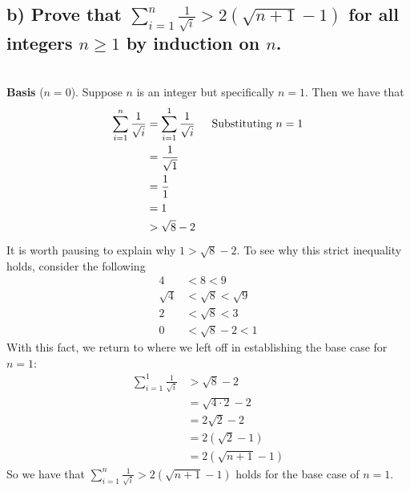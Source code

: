 \documentclass[11pt, letterpaper]{article}
\begin{document}
\subsection*{b) Prove that $\sum_{i=1}^{n}\frac{1}{\sqrt{i}}>2(\sqrt{n+1}-1)$ for all integers $n\geq 1$ by induction on $n$.}
\begin{prf}[by induction]~\\
    {\bf Basis} ($n=0$). Suppose $n$ is an integer but specifically $n=1$. Then we have that
    \begin{align*}
        \sum_{i=1}^n\frac{1}{\sqrt{i}} &= \sum_{i=1}^1\frac{1}{\sqrt{i}} \text{\indent Substituting $n=1$}\\
        &= \frac{1}{\sqrt{1}}\\
        &= \frac{1}{1}\\
        &= 1\\
        &> \sqrt{8}-2
    \end{align*}
    It is worth pausing to explain why $1>\sqrt{8}-2$. To see why this strict inequality holds, consider the following
    \begin{align*}
        4&<8<9\\
        \sqrt{4}&<\sqrt{8}<\sqrt{9}\\
        2&<\sqrt{8}<3\\
        0&<\sqrt{8}-2<1
    \end{align*}
    With this fact, we return to where we left off in establishing the base case for $n=1$:
    \begin{align*}
        \sum_{i=1}^1\frac{1}{\sqrt{i}} &> \sqrt{8}-2\\
        &= \sqrt{4\cdot 2}-2\\
        &= 2\sqrt{2}-2\\
        &= 2(\sqrt{2}-1)\\
        &= 2(\sqrt{n+1}-1)
    \end{align*}
    So we have that $\sum_{i=1}^{n}\frac{1}{\sqrt{i}}>2(\sqrt{n+1}-1)$ holds for the base case of $n=1$.


\end{prf}
\end{document}
